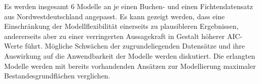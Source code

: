 {  Es werden insgesamt 6 Modelle an je einen Buchen- und einen Fichtendatensatz aus Nordwestdeutschland angepasst.  Es kann gezeigt werden, dass eine Einschränkung der Modellflexibilität einerseits zu plausibleren Ergebnissen, andererseits aber zu einer verringerten Aussagekraft in Gestalt höherer AIC-Werte führt.  Mögliche Schwächen der zugrundeliegenden Datensätze und ihre Auswirkung auf die Anwendbarkeit der Modelle werden diskutiert.  Die erlangten Modelle werden mit bereits vorhandenden Ansätzen zur Modellierung maximaler Bestandesgrundflächen verglichen.

  
}
